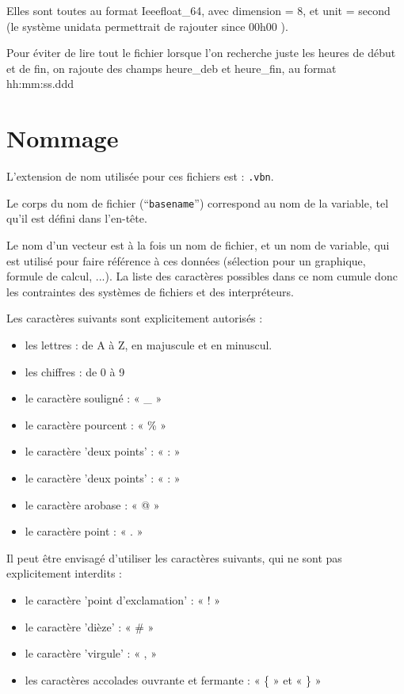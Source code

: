 Elles sont toutes au format \textsf{Ieeefloat\_64}, avec
\textsf{dimension = 8}, et \textsf{unit = second}
(le système unidata permettrait de rajouter  since 00h00 ).

Pour éviter de lire tout le fichier lorsque l'on recherche juste les heures de
début et de fin, on rajoute des champs \textsf{heure\_deb} et \textsf{heure\_fin},
au format \textsf{hh\string:mm\string:ss.ddd}

\section{Nommage}

  L'extension de nom utilisée pour ces fichiers est : \texttt{.vbn}.

  Le corps du nom de fichier (``\texttt{basename}'') correspond au
nom de la variable, tel qu'il est défini dans l'en-tête.

  Le nom d'un vecteur est à la fois un nom de fichier, et un nom de
variable, qui est utilisé pour faire référence à ces données (sélection
pour un graphique, formule de calcul, ...). La liste des caractères
possibles dans ce nom
cumule donc les contraintes des systèmes de fichiers et des interpréteurs.

\medbreak
  Les caractères suivants sont explicitement autorisés :

\begin{itemize}
	\item les lettres : de A à Z, en majuscule et en minuscul.
	\item les chiffres :  de 0 à 9
    \item le caractère souligné : « \_ »
    \item le caractère pourcent : « \% »
    \item le caractère 'deux points' : « : »
    \item le caractère 'deux points' : « : »
    \item le caractère arobase       : « @ »
    \item le caractère point         : « . »
\end{itemize}

\medbreak
  Il peut être envisagé d'utiliser les caractères suivants, qui ne sont pas
explicitement interdits  :

\begin{itemize}
  \item le caractère 'point d’exclamation' : « ! »
  \item le caractère 'dièze'               : « \# »
  \item le caractère 'virgule'             : « , »
  \item les caractères accolades ouvrante et fermante : « \{ » et « \} »
\end{itemize}

